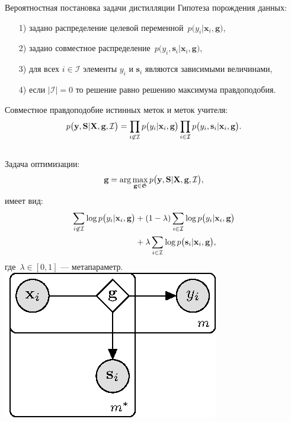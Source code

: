 \documentclass[10pt,pdf,hyperref={unicode}]{beamer}
\begin{document}
\begin{frame}{Вероятностная постановка задачи дистилляции}
\justifying
Гипотеза порождения данных:
\begin{enumerate}
	\item[1)] задано распределение целевой переменной~$p\bigr(y_i|\textbf{x}_i, \textbf{g}\bigr)$,
	\item[2)] задано совместное распределение~$p\bigr(y_i, \textbf{s}_i|\textbf{x}_i, \textbf{g}\bigr)$,
	\item[3)] для всех $i \in \mathcal{I}$ элементы $y_i$ и $\textbf{s}_i$ являются зависимыми величинами,
	\item[4)] если $|\mathcal{I}|=0$ то решение равно решению максимума правдоподобия.
\end{enumerate}
Совместное правдоподобие истинных меток и меток учителя:
\[
\setlength\abovedisplayskip{0pt}
p\bigr(\textbf{y}, \textbf{S}|\textbf{X}, \textbf{g}, \mathcal{I}\bigr)=\prod_{i\not\in \mathcal{I}}p\bigr(y_i|\textbf{x}_i, \textbf{g}\bigr)\prod_{i\in \mathcal{I}}p\bigr(y_i, \textbf{s}_i|\textbf{x}_i, \textbf{g}\bigr).
\setlength\belowdisplayskip{0pt}
\]

\begin{columns}
Задача оптимизации:
\[
\setlength\abovedisplayskip{0pt}
\textbf{g} = \arg\max_{\textbf{g} \in \mathfrak{G}} p\bigr(\textbf{y}, \textbf{S}|\textbf{X}, \textbf{g}, \mathcal{I}\bigr),
\setlength\belowdisplayskip{0pt}
\]
имеет вид:
\[
\setlength\abovedisplayskip{0pt}
\begin{aligned}
\sum_{i\not\in \mathcal{I}}\log p\bigr(y_i|\textbf{x}_i, \textbf{g}\bigr) &+ \left(1-\lambda\right)\sum_{i\in \mathcal{I}}\log p\bigr(y_i|\textbf{x}_i, \textbf{g}\bigr) \\
&+ \lambda\sum_{i\in \mathcal{I}}\log p\bigr(\textbf{s}_i|\textbf{x}_i, \textbf{g}\bigr),
\end{aligned}
\setlength\belowdisplayskip{0pt}
\]
где~$\lambda \in [0,1]$ --- метапараметр.
\includegraphics[width=\textwidth]{figures/proba_model}
\end{columns}

\end{frame}
\end{document}
